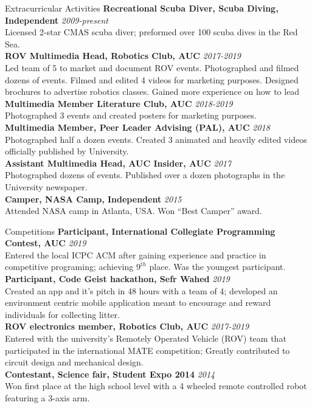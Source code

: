 \documentclass{resume}
\begin{document}
\begin{small}
	\pagebreak
	\begin{rSection} {Extracurricular Activities}
		{\bf Recreational Scuba Diver, Scuba Diving, Independent} \hfill {\em 2009-present}\\
		Licensed 2-star CMAS scuba diver; preformed over 100 scuba dives in the Red Sea.\\
		{\bf ROV Multimedia Head, Robotics Club, AUC} \hfill {\em 2017-2019} \\
		Led team of 5 to market and document ROV events. Photographed and filmed dozens of events. Filmed and edited 4 videos for marketing purposes. Designed brochures to advertise robotics classes. Gained more experience on how to lead\\
		{\bf Multimedia Member Literature Club, AUC} \hfill {\em 2018-2019} \\
		Photographed 3 events and created posters for marketing purposes.\\
		{\bf Multimedia Member, Peer Leader Advising (PAL), AUC} \hfill {\em 2018}\\
		Photographed half a dozen events. Created 3 animated and heavily edited videos officially published by University.\\
		{\bf Assistant Multimedia Head, AUC Insider, AUC} \hfill {\em 2017}\\
		Photographed dozens of events. Published over a dozen photographs in the University newspaper.\\
		{\bf Camper, NASA Camp, Independent} \hfill {\em 2015}\\
		Attended NASA camp in Atlanta, USA. Won “Best Camper” award.\\
		
	\end{rSection}

	\begin{rSection}{Competitions}
		{\bf Participant, International Collegiate Programming Contest, AUC} \hfill {\em 2019} \\
		Entered the local ICPC ACM after gaining experience and practice in competitive programing; achieving $9^{th}$ place. Was the youngest participant. \\
		{\bf Participant, Code Geist hackathon, Sefr Wahed} \hfill {\em 2019} \\
		Created an app and it's pitch in 48 hours with a team of 4; developed an environment centric mobile application meant to encourage and reward individuals for collecting litter.\\
		{\bf ROV electronics member, Robotics Club, AUC} \hfill {\em 2017-2019} \\
		Entered with the university's Remotely Operated Vehicle (ROV) team that participated in the international MATE competition; Greatly contributed to circuit design and mechanical design. \\
		{\bf Contestant, Science fair, Student Expo 2014} \hfill {\em 2014} \\
		Won first place at the high school level with a 4 wheeled remote controlled robot featuring a 3-axis arm.
	\end{rSection}
	

\end{small}
\end{document}
